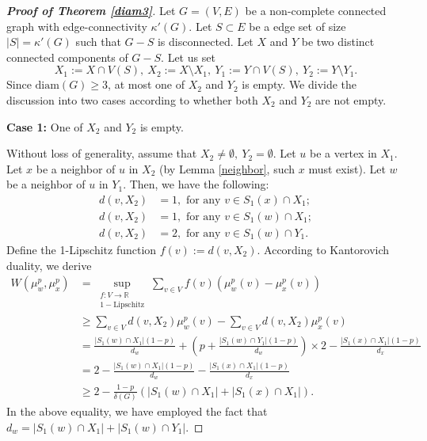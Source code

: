 \documentclass[11pt,bezier]{article}
\theoremstyle{definition}
\theoremstyle{definition}
\theoremstyle{nonumber}
\begin{document}
\begin{proof}[\bf{Proof of Theorem \ref{diam3}}]
Let $G=(V,E)$ be a non-complete connected graph with edge-connectivity $\kappa'(G)$. Let $S \subset E$ be a edge set of size $|S| = \kappa'(G)$ such that $G - S$ is disconnected. Let $X$ and $Y$ be two distinct connected components of $G - S$.
Let us set
$$
X_1:=X\cap V(S),\ X_2:=X \setminus X_1,\ Y_1:=Y\cap V(S),\ Y_2:=Y \setminus Y_1.
$$
Since $\mathrm{diam}(G)\geq3$, at most one of $X_2$ and $Y_2$ is empty. We divide the discussion into two cases according to whether both $X_2$ and $Y_2$ are not empty.

\textbf{Case 1:} One of $X_2$ and $Y_2$ is empty.

Without loss of generality, assume that $X_2\ne\emptyset,\ Y_2=\emptyset$.
Let $u$ be a vertex in $X_1$. Let $x$ be a neighbor of $u$ in $X_2$ (by Lemma \ref{neighbor}, such $x$ must exist). Let $w$ be a neighbor of $u$ in $Y_1$. Then, we have the following:
\begin{align*} 
d(v, X_2) &= 1, \text{ for any } v \in S_1(x) \cap X_1;\\
d(v, X_2) &= 1, \text{ for any } v \in S_1(w) \cap X_1;\\
d(v, X_2) &= 2, \text{ for any } v \in S_1(w) \cap Y_1.
\end{align*}
Define the 1-Lipschitz function $f(v):=d(v, X_2)$. According to Kantorovich duality, we derive
\begin{align*}
W(\mu_w^p, \mu_x^p) &= \sup_{\substack{f: V \to \mathbb{R} \\ 1-\text{Lipschitz}}} \sum_{v \in V} f(v) \left( \mu_w^p(v) - \mu_x^p(v) \right)\\
&\geq \sum_{v \in V} d(v, X_2) \mu_w^p(v) - \sum_{v \in V} d(v, X_2) \mu_x^p(v)\\
&= \frac{|S_1(w) \cap X_1|(1-p)}{d_w} + \left( p + \frac{|S_1(w) \cap Y_1|(1-p)}{d_w} \right) \times 2 - \frac{|S_1(x) \cap X_1|(1-p)}{d_x}\\
&= 2 - \frac{|S_1(w) \cap X_1|(1-p)}{d_w} - \frac{|S_1(x) \cap X_1|(1-p)}{d_x}\\
&\geq 2 - \frac{1-p}{\delta(G)} \left( |S_1(w) \cap X_1| + |S_1(x) \cap X_1| \right).
\end{align*}
In the above equality, we have employed the fact that $d_w = |S_1(w) \cap X_1| + |S_1(w) \cap Y_1|$.


\end{proof}
\end{document}
